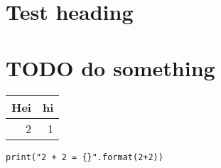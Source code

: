 \documentclass[11pt]{article}
\date{\today}
\title{}
\begin{document}
\tableofcontents

\section{Test heading}
\label{sec:org92d2f58}
\section{{\bfseries\sffamily TODO} do something}
\label{sec:orged0b48a}

\begin{center}
\begin{tabular}{rr}
Hei & hi\\
\hline
2 & 1\\
\end{tabular}
\end{center}


\begin{verbatim}
print("2 + 2 = {}".format(2+2))
\end{verbatim}
\end{document}
